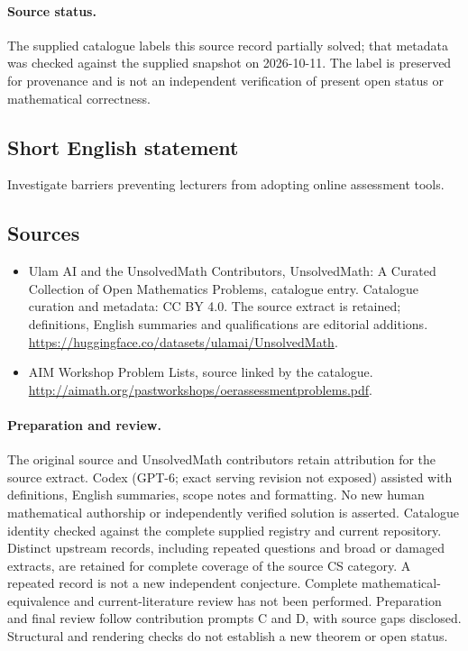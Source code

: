 \documentclass[11pt]{article}
\begin{document}
\paragraph{Source status.}
The supplied catalogue labels this source record partially solved; that metadata was checked against the supplied snapshot on 2026-10-11. The label is preserved for provenance and is not an independent verification of present open status or mathematical correctness.
\subsection{Short English statement}
Investigate barriers preventing lecturers from adopting online assessment tools.
\subsection{Sources}
\begin{itemize}
\item[\hypertarget{source:statement:1}{S1}] Ulam AI and the UnsolvedMath Contributors, UnsolvedMath: A Curated Collection of Open Mathematics Problems, catalogue entry. Catalogue curation and metadata: CC BY 4.0. The source extract is retained; definitions, English summaries and qualifications are editorial additions.
\url{https://huggingface.co/datasets/ulamai/UnsolvedMath}.
\item[\hypertarget{source:statement:2}{S2}] AIM Workshop Problem Lists, source linked by the catalogue.
\url{http://aimath.org/pastworkshops/oerassessmentproblems.pdf}.
\end{itemize}
\paragraph{Preparation and review.}
The original source and UnsolvedMath contributors retain attribution for the source extract. Codex (GPT-6; exact serving revision not exposed) assisted with definitions, English summaries, scope notes and formatting. No new human mathematical authorship or independently verified solution is asserted. Catalogue identity checked against the complete supplied registry and current repository. Distinct upstream records, including repeated questions and broad or damaged extracts, are retained for complete coverage of the source CS category. A repeated record is not a new independent conjecture. Complete mathematical-equivalence and current-literature review has not been performed. Preparation and final review follow contribution prompts C and D, with source gaps disclosed. Structural and rendering checks do not establish a new theorem or open status.
\label{end:statement}
\end{document}
